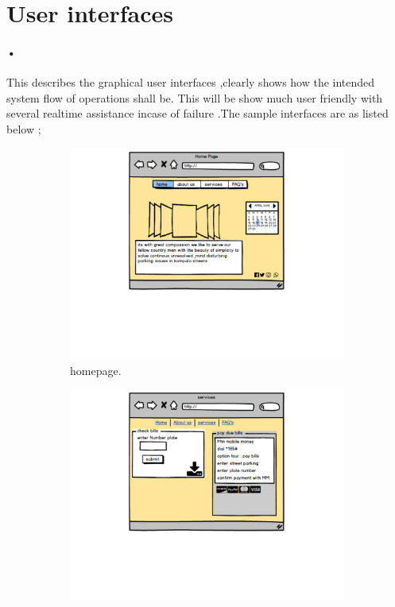 \documentclass[12pt]{article}
\begin{document}
\section{User interfaces}
\paragraph{•}This describes the graphical user interfaces ,clearly shows how the intended system flow of operations shall be. This will be show much user friendly with several realtime assistance incase of failure .The sample interfaces are as listed below ;
\begin{figure}[h!]
  \centering
  \begin{subfigure}[b]{0.4\linewidth}
    \includegraphics[width=\linewidth]{research.pdf}
     \caption{homepage.}
  \end{subfigure}
  \begin{subfigure}[b]{0.4\linewidth}
    \includegraphics[width=\linewidth]{services.pdf}

\end{subfigure}
\end{figure}
\end{document}
